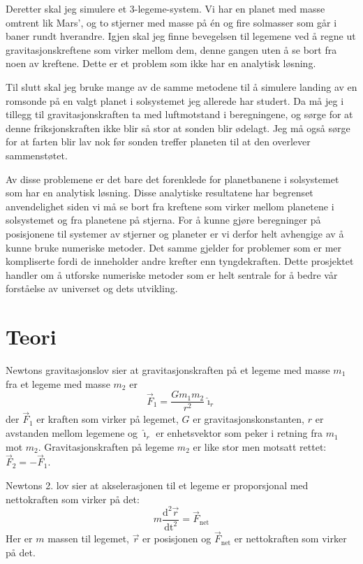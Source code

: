 \documentclass[reprint,english,notitlepage]{revtex4-1}  %
\begin{document}
Deretter skal jeg simulere et 3-legeme-system. Vi har en planet med masse omtrent lik Mars', og to stjerner med masse på én og fire solmasser som går i baner rundt hverandre. Igjen skal jeg finne bevegelsen til legemene ved å regne ut gravitasjonskreftene som virker mellom dem, denne gangen uten å se bort fra noen av kreftene. Dette er et problem som ikke har en analytisk løsning.

Til slutt skal jeg bruke mange av de samme metodene til å simulere landing av en romsonde på en valgt planet i solsystemet jeg allerede har studert. Da må jeg i tillegg til gravitasjonskraften ta med luftmotstand i beregningene, og sørge for at denne friksjonskraften ikke blir så stor at sonden blir ødelagt. Jeg må også sørge for at farten blir lav nok før sonden treffer planeten til at den overlever sammenstøtet.

Av disse problemene er det bare det forenklede for planetbanene i solsystemet som har en analytisk løsning. Disse analytiske resultatene har begrenset anvendelighet siden vi må se bort fra kreftene som virker mellom planetene i solsystemet og fra planetene på stjerna. For å kunne gjøre beregninger på posisjonene til systemer av stjerner og planeter er vi derfor helt avhengige av å kunne bruke numeriske metoder. Det samme gjelder for problemer som er mer kompliserte fordi de inneholder andre krefter enn tyngdekraften. Dette prosjektet handler om å utforske numeriske metoder som er helt sentrale for å bedre vår forståelse av universet og dets utvikling.


\section{Teori}

Newtons gravitasjonslov sier at gravitasjonskraften på et legeme med masse $m_1$ fra et legeme med
 masse $m_2$ er
 \begin{equation}
   \label{eq:NGrav}
   \vec{F}_1 = \frac{G m_1 m_2}{r^2} \hat{\imath}_r
 \end{equation}
 der $\vec{F}_1$ er kraften som virker på legemet, $G$ er gravitasjonskonstanten, $r$ er avstanden mellom legemene og $\hat{\imath}_r$ er enhetsvektor som peker i retning fra $m_1$ mot $m_2$. Gravitasjonskraften på legeme $m_2$ er like stor men motsatt rettet: $\vec{F}_2 = -\vec{F}_1$.

Newtons 2. lov sier at akselerasjonen til et legeme er proporsjonal med nettokraften som virker på
 det:
 \begin{equation}
   \label{eq:N2}
   m \frac{\mathrm{d}^2 \vec{r}}{\mathrm{dt}^2} = \vec{F}_{\text{net}}
 \end{equation}
 Her er $m$ massen til legemet, $\vec{r}$ er posisjonen og $\vec{F}_{\text{net}}$ er nettokraften som virker på det.
\end{document}
